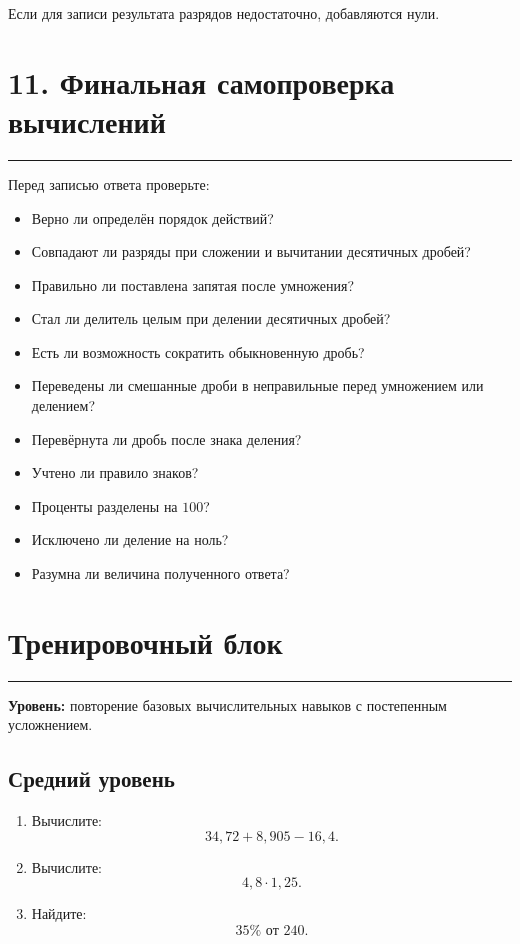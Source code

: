 \documentclass[a4paper,12pt]{article}
\newcommand{\sectionline}{%
    \vspace{-0.25em}
    {\color{accent}\rule{\linewidth}{0.7pt}}
    \vspace{0.3em}
}
\newcommand{\checkitem}{\item[\textcolor{accent}{$\checkmark$}]}
\begin{document}
Если для записи результата разрядов недостаточно, добавляются нули.


\section*{\color{darkaccent}11. Финальная самопроверка вычислений}
\sectionline

Перед записью ответа проверьте:

\begin{itemize}
    \checkitem Верно ли определён порядок действий?
    \checkitem Совпадают ли разряды при сложении и вычитании десятичных дробей?
    \checkitem Правильно ли поставлена запятая после умножения?
    \checkitem Стал ли делитель целым при делении десятичных дробей?
    \checkitem Есть ли возможность сократить обыкновенную дробь?
    \checkitem Переведены ли смешанные дроби в неправильные перед умножением или делением?
    \checkitem Перевёрнута ли дробь после знака деления?
    \checkitem Учтено ли правило знаков?
    \checkitem Проценты разделены на \(100\)?
    \checkitem Исключено ли деление на ноль?
    \checkitem Разумна ли величина полученного ответа?
\end{itemize}


\clearpage
\section*{\color{darkaccent}Тренировочный блок}
\sectionline

\textbf{Уровень:} повторение базовых вычислительных навыков с постепенным
усложнением.

\subsection*{\color{accent}Средний уровень}

\begin{enumerate}
    \item Вычислите:
    \[
    34{,}72+8{,}905-16{,}4.
    \]

    \item Вычислите:
    \[
    4{,}8\cdot1{,}25.
    \]

    \item Найдите:
    \[
    35\%\text{ от }240.
    \]
\end{enumerate}
\end{document}
